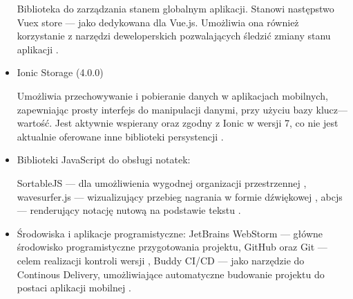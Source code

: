 \begin{itemize}
	      Biblioteka do zarządzania stanem globalnym aplikacji. Stanowi następstwo Vuex store — jako dedykowana dla
	      Vue.js. Umożliwia ona również korzystanie z narzędzi deweloperskich pozwalających śledzić zmiany stanu aplikacji \cite{pinia}.
	\item Ionic Storage (4.0.0)

	      Umożliwia przechowywanie i pobieranie danych
	      w aplikacjach mobilnych, zapewniając prosty interfejs do manipulacji danymi, przy użyciu bazy klucz—wartość.
	      Jest aktywnie wspierany oraz zgodny z Ionic w wersji 7, co nie jest aktualnie oferowane inne biblioteki persystencji \cite{storage}.
	\item Biblioteki JavaScript do obsługi notatek:

	      SortableJS — dla umożliwienia wygodnej organizacji przestrzennej \cite{sortablejs},
	      wavesurfer.js — wizualizujący przebieg nagrania w formie dźwiękowej \cite{wavesurfer},
	      abcjs — renderujący notację nutową na podstawie tekstu \cite{abcjs}.

	\item Środowiska i aplikacje programistyczne:
	      JetBrains WebStorm — główne środowisko programistyczne przygotowania projektu\cite{webstorm},
	      GitHub oraz Git — celem realizacji kontroli wersji \cite{github}\cite{git},
	      Buddy CI/CD — jako narzędzie do Continous Delivery, umożliwiające automatyczne budowanie projektu do
	      postaci aplikacji mobilnej \cite{buddy}.
\end{itemize}